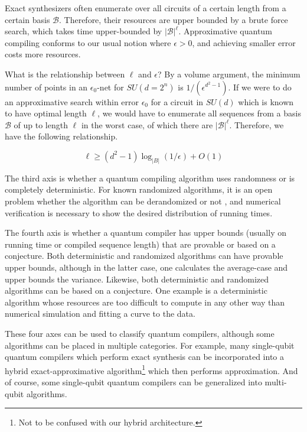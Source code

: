 Exact synthesizers often enumerate over all circuits of
a certain length from a certain basis $\mathcal{B}$. Therefore, their
resources are upper bounded by a brute force search, which takes
time upper-bounded by $|\mathcal{B}|^{\ell}$.
Approximative quantum compiling conforms to our usual notion where
$\epsilon > 0$, and achieving smaller error costs more resources.

What is the relationship between $\ell$ and $\epsilon$? By a volume
argument, the minimum number of points in an $\epsilon_0$-net for
$SU(d=2^n)$ is $1/(\epsilon^{d^2 - 1})$. If we were to do an approximative
search within error $\epsilon_0$
for a circuit in $SU(d)$ which is known to have optimal length
$\ell$, we would have to enumerate all sequences from a basis $\mathcal{B}$
of up to length $\ell$ in the worst case, of which there are $|\mathcal{B}|^{\ell}$.
Therefore, we have the following relationship.

\begin{equation}
\ell \ge (d^2 - 1) \log_{|B|}(1/\epsilon) + O(1)
\end{equation}

The third axis is whether a quantum compiling algorithm uses randomness
or is completely deterministic. For known randomized algorithms, it is
an open problem whether the algorithm can be derandomized or not
\cite{Kliuchnikov2012a}, and numerical verification is necessary to
show the desired distribution of running times.

The fourth axis is whether a quantum compiler has upper bounds
(usually on running time or compiled sequence length) that are provable or
based on a conjecture. Both deterministic and randomized
algorithms can have provable upper bounds, although
in the latter case, one calculates the average-case and upper bounds the
variance. Likewise, both deterministic and randomized algorithms can
be based on a conjecture. One example is a deterministic algorithm
whose resources are too difficult to compute in any other way than
numerical simulation and fitting a curve to the data.

These four axes can be used to classify quantum compilers, although some
algorithms can be placed in multiple categories. For example, many
single-qubit quantum compilers which perform exact synthesis can be
incorporated into a hybrid exact-approximative algorithm\footnote{Not to be
confused with our hybrid architecture.} which then performs
approximation. And of course, some single-qubit quantum compilers can be generalized
into multi-qubit algorithms.

